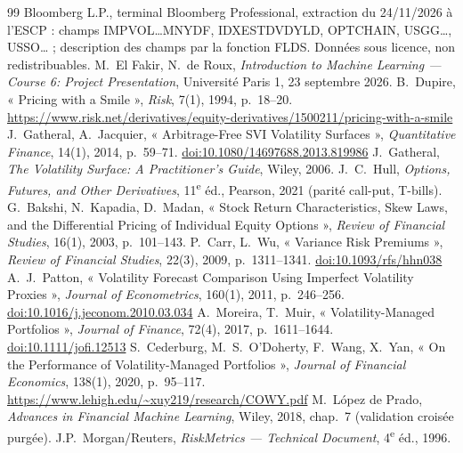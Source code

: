 \documentclass[10pt,a4paper]{article}
\newcommand{\coupure}{\textunderscore\allowbreak}
\newcommand{\fic}[1]{{\small\ttfamily\let\_\coupure #1}}
\begin{document}
{\small\sloppy
\begin{thebibliography}{99}\setlength{\itemsep}{1pt}\setlength{\parskip}{0pt}
 Bloomberg L.P., terminal Bloomberg Professional, extraction du 24/11/2026 à l'ESCP : champs \fic{IMPVOL\_\ldots MNY\_DF}, \fic{IDX\_EST\_DVD\_YLD}, \fic{OPT\_CHAIN}, \fic{USGG\ldots}, \fic{USSO\ldots} ; description des champs par la fonction FLDS. Données sous licence, non redistribuables.
 M.~El Fakir, N.~de Roux, \emph{Introduction to Machine Learning — Course 6: Project Presentation}, Université Paris 1, 23 septembre 2026.
 B.~Dupire, « Pricing with a Smile », \emph{Risk}, 7(1), 1994, p.~18–20. \url{https://www.risk.net/derivatives/equity-derivatives/1500211/pricing-with-a-smile}
 J.~Gatheral, A.~Jacquier, « Arbitrage-Free SVI Volatility Surfaces », \emph{Quantitative Finance}, 14(1), 2014, p.~59–71. \href{https://doi.org/10.1080/14697688.2013.819986}{doi:10.1080/14697688.2013.819986}
 J.~Gatheral, \emph{The Volatility Surface: A Practitioner's Guide}, Wiley, 2006.
 J.~C.~Hull, \emph{Options, Futures, and Other Derivatives}, 11\textsuperscript{e} éd., Pearson, 2021 (parité call-put, T-bills).
 G.~Bakshi, N.~Kapadia, D.~Madan, « Stock Return Characteristics, Skew Laws, and the Differential Pricing of Individual Equity Options », \emph{Review of Financial Studies}, 16(1), 2003, p.~101–143.
 P.~Carr, L.~Wu, « Variance Risk Premiums », \emph{Review of Financial Studies}, 22(3), 2009, p.~1311–1341. \href{https://doi.org/10.1093/rfs/hhn038}{doi:10.1093/rfs/hhn038}
 A.~J.~Patton, « Volatility Forecast Comparison Using Imperfect Volatility Proxies », \emph{Journal of Econometrics}, 160(1), 2011, p.~246–256. \href{https://doi.org/10.1016/j.jeconom.2010.03.034}{doi:10.1016/j.jeconom.2010.03.034}
 A.~Moreira, T.~Muir, « Volatility-Managed Portfolios », \emph{Journal of Finance}, 72(4), 2017, p.~1611–1644. \href{https://doi.org/10.1111/jofi.12513}{doi:10.1111/jofi.12513}
 S.~Cederburg, M.~S.~O'Doherty, F.~Wang, X.~Yan, « On the Performance of Volatility-Managed Portfolios », \emph{Journal of Financial Economics}, 138(1), 2020, p.~95–117. \url{https://www.lehigh.edu/~xuy219/research/COWY.pdf}
 M.~López de Prado, \emph{Advances in Financial Machine Learning}, Wiley, 2018, chap.~7 (validation croisée purgée).
 J.P.~Morgan/Reuters, \emph{RiskMetrics — Technical Document}, 4\textsuperscript{e} éd., 1996.

\end{thebibliography}}
\end{document}
